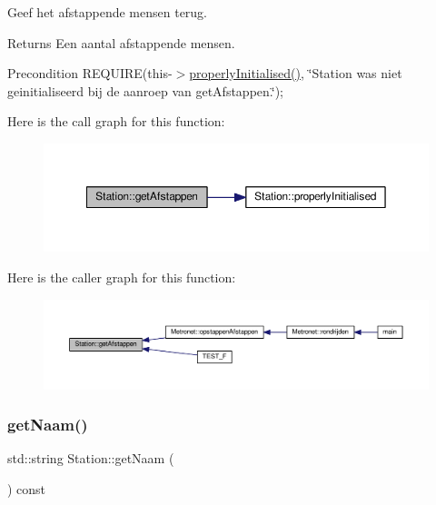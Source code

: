 Geef het afstappende mensen terug. 

\begin{DoxyReturn}{Returns}
Een aantal afstappende mensen. 
\end{DoxyReturn}
\begin{DoxyPrecond}{Precondition}
R\+E\+Q\+U\+I\+RE(this-\/$>$\hyperlink{class_station_a9ce626dd0599e3ea8107404a59c21e16}{properly\+Initialised()}, \char`\"{}\+Station was niet geinitialiseerd bij de aanroep van get\+Afstappen.\char`\"{}); 
\end{DoxyPrecond}
Here is the call graph for this function\+:\nopagebreak
\begin{figure}[H]
\begin{center}
\leavevmode
\includegraphics[width=350pt]{class_station_a36af036851a8e31b7a2be381928dadb5_cgraph}
\end{center}
\end{figure}
Here is the caller graph for this function\+:\nopagebreak
\begin{figure}[H]
\begin{center}
\leavevmode
\includegraphics[width=350pt]{class_station_a36af036851a8e31b7a2be381928dadb5_icgraph}
\end{center}
\end{figure}
\mbox{\label{class_station_aea6c31c39a5e1eb4c30337e7ce489e69}} 
\subsubsection{\texorpdfstring{get\+Naam()}{getNaam()}}
{\footnotesize\ttfamily std\+::string Station\+::get\+Naam (\begin{DoxyParamCaption}{ }\end{DoxyParamCaption}) const}



